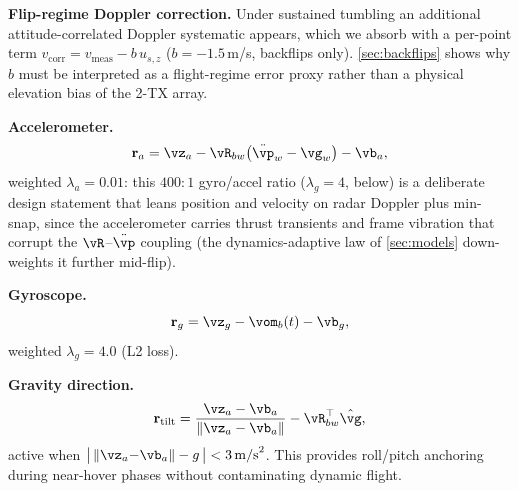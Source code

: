 \textbf{Flip-regime Doppler correction.}
Under sustained tumbling an additional attitude-correlated Doppler
systematic appears, which we absorb with a per-point term
$v_{\mathrm{corr}} = v_{\mathrm{meas}} - b\,u_{s,z}$ ($b{=}{-}1.5$\,m/s,
backflips only).  \autoref{sec:backflips} shows why $b$ must be
interpreted as a flight-regime error proxy rather than a physical
elevation bias of the 2-TX array.

\textbf{Accelerometer.}
\begin{equation}
  \mathbf{r}_a = \vz_a - \vR_{bw}\!\left(\ddot{\vp}_w - \vg_w\right) - \vb_a,
  \label{eq:accel}
\end{equation}
weighted $\lambda_a = 0.01$: this $400{:}1$ gyro/accel ratio
($\lambda_g{=}4$, below) is a deliberate design statement that leans
position and velocity on radar Doppler plus min-snap, since the
accelerometer carries thrust transients and frame vibration that
corrupt the $\vR$--$\ddot{\vp}$ coupling (the dynamics-adaptive law of
\autoref{sec:models} down-weights it further mid-flip).

\textbf{Gyroscope.}
\begin{equation}
  \mathbf{r}_g = \vz_g - \vom_b(t) - \vb_g,
  \label{eq:gyro}
\end{equation}
weighted $\lambda_g = 4.0$ (L2 loss).

\textbf{Gravity direction.}
\begin{equation}
  \mathbf{r}_{\mathrm{tilt}} =
    \frac{\vz_a - \vb_a}{\|\vz_a - \vb_a\|} - \vR_{bw}^{\top}\hat{\vg},
  \label{eq:tilt}
\end{equation}
active when $\bigl|\,\|\vz_a{-}\vb_a\| - g\,\bigr| < 3\,\mathrm{m/s}^2$.
This provides roll/pitch anchoring during near-hover phases without
contaminating dynamic flight.

